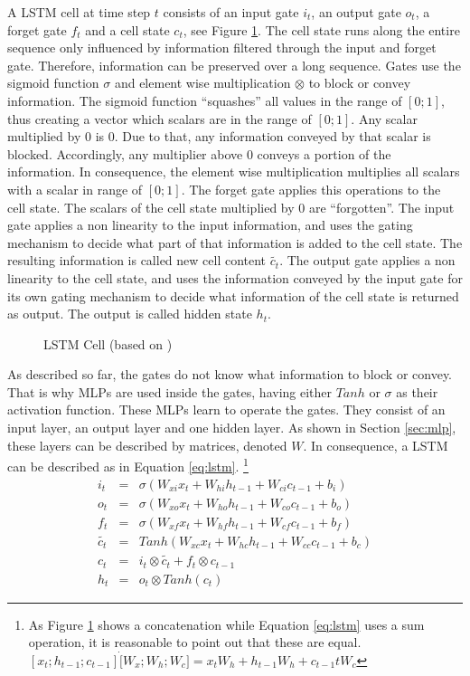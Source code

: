 		A \ac{LSTM} cell at time step $t$ consists of an input gate $i_t$, an output gate $o_t$, a forget gate $f_t$ and a cell state $c_t$, see Figure \ref{img:lstm}. The cell state runs along the entire sequence only influenced by information filtered through the input and forget gate. Therefore, information can be preserved over a long sequence.
		Gates use the sigmoid function $\sigma$ and element wise multiplication $\otimes$ to block or convey information. The sigmoid function \enquote{squashes} all values in the range of $[0;1]$,  thus creating a vector which scalars are in the range of $[0;1]$. Any scalar multiplied by $0$ is $0$. Due to that, any information conveyed by that scalar is blocked. Accordingly, any multiplier above $0$ conveys a portion of the information. In consequence, the element wise multiplication multiplies all scalars with a scalar in range of $[0;1]$.
		The forget gate applies this operations to the cell state. The scalars of the cell state multiplied by $0$ are \enquote{forgotten}. The input gate applies a non linearity to the input information, and uses the gating mechanism to decide what part of that information is added to the cell state. The resulting information is called new cell content $\tilde{c_t}$. The output gate applies a non linearity to the cell state, and uses the information conveyed by the input gate for its own gating mechanism to decide what information of the cell state is returned as output. The output is called hidden state $h_t$.
		\begin{figure}[H]
			\centering
			
			\caption{LSTM Cell (based on \cite{Graves.2013})} \label{img:lstm}
		\end{figure}
		As described so far, the gates do not know what information to block or convey. That is why \ac{MLP}s are used inside the gates, having either $Tanh$ or $\sigma$ as their activation function. These \ac{MLP}s learn to operate the gates. They consist of an input layer, an output layer and one hidden layer. As shown in Section \ref{sec:mlp}, these layers can be described by matrices, denoted $W$. In consequence, a \ac{LSTM} can be described as in Equation \eqref{eq:lstm}. \autocite{Graves.2013} 
		\footnote{As Figure \ref{img:lstm} shows a concatenation while Equation \eqref{eq:lstm} uses a sum operation, it is reasonable to point out that these are equal. $[x_t; h_{t-1}; c_{t-1}] \dot [W_x; W_h; W_c] = x_tW_h + h_{t-1}W_h + c_{t-1}tW_c$}
		\begin{equation}
			\label{eq:lstm}
			\begin{array}{lcl}
				i_t & = & \sigma(W_{xi}x_t + W_{hi}h_{t-1} + W_{ci}c_{t-1} + b_i) \\
				o_t & = & \sigma(W_{xo}x_t + W_{ho}h_{t-1} + W_{co}c_{t-1} + b_o) \\
				f_t & = & \sigma(W_{xf}x_t + W_{hf}h_{t-1} + W_{cf}c_{t-1} + b_f) \\
				\tilde{c_t} & = & Tanh(W_{xc}x_t + W_{hc}h_{t-1} + W_{cc}c_{t-1} + b_c) \\
				c_t & = & i_t \otimes \tilde{c_t} + f_t \otimes c_{t-1} \\
				h_t & = & o_t \otimes Tanh(c_t)
			\end{array}
		\end{equation}
		
